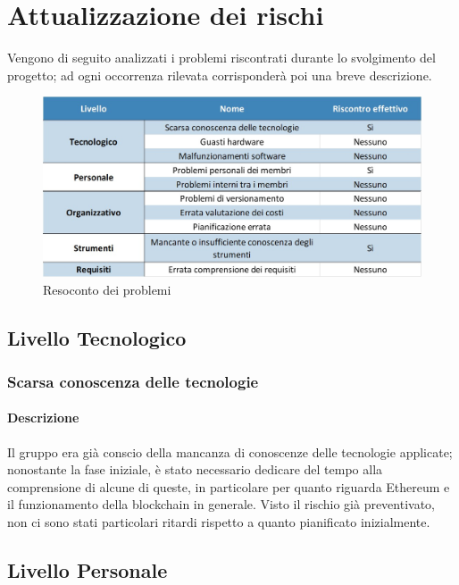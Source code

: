 \newpage
\appendix
\section{Attualizzazione dei rischi} \label{RiscontroRischi}

Vengono di seguito analizzati i problemi riscontrati durante lo svolgimento del progetto; ad ogni occorrenza rilevata corrisponderà poi una breve descrizione.\\

\begin{figure}[h!]
	\centerline{\includegraphics[scale=0.50]{img/RiscontroProblemi.jpg}}
	\caption{Resoconto dei problemi}
	\label{fig:resoconto_probl}
\end{figure}

\subsection{Livello Tecnologico}
\subsubsection{Scarsa conoscenza delle tecnologie}
\paragraph {Descrizione}
Il gruppo era già conscio della mancanza di conoscenze delle tecnologie applicate; nonostante la fase iniziale, è stato necessario dedicare del tempo alla comprensione di alcune di queste, in particolare per quanto riguarda Ethereum e il funzionamento della blockchain in generale. Visto il rischio già preventivato, non ci sono stati particolari ritardi rispetto a quanto pianificato inizialmente.

\subsection{Livello Personale}
